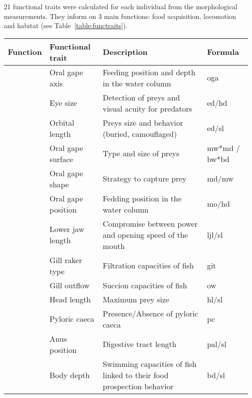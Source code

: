 21 functional traits were calculated for each individual from the morphological measurements. They inform on 3 main functions: food acquisition, locomotion and habitat (see Table~\ref{table:functraits}).

\begin{sidewaystable}
\centering
\caption[Functional traits descriptions and formulas]{Description and formulas of the functionals traits computed from morphological measurements, following \citep{albouy2011, aneeshkumar2017,boyle2006,brindamour2016,diderich2006,dumay2004,habib2019,ibanez2007,sibbing2000,webb1984,winemiller1991}. Abbreviations used in formulas are provided by raw measurements and detailed in appendices \ref{fig:full_body}, \ref{fig:head} \& \ref{fig:fin}. \texttt{oga}, \texttt{git}, \texttt{pc}, \texttt{pht} are categorial variables directly provided by raw measurements with the first two scores detailed respectively in appendices \ref{fig:git} \& \ref{fig:oga}.}
\label{table:functraits}
\begin{tabular}{>{\bfseries}llll}
\toprule
Function & Functional trait & Description & Formula  \\ 
\midrule
\multirow{13}{*}{Feeding} &Oral gape axis & Feeding position and depth in the water column & oga \\ 
  &Eye size & Detection of preys and visual acuity for predators & ed/hd \\ 
  &Orbital length & Preys size and behavior (buried, camouflaged) & ed/sl \\ 
  &Oral gape surface & Type and size of preys & mw*md / bw*bd \\ 
  &Oral gape shape & Strategy to capture prey & md/mw \\ 
  &Oral gape position & Fedding position in the water column & mo/hd \\ 
  &Lower jaw length & Compromise between power and opening speed of the mouth & ljl/sl \\ 
  &Gill raker type & Filtration capacities of fish & git \\ 
  &Gill outflow & Succion capacities of fish & ow \\ 
  &Head length & Maximum prey size & hl/sl \\ 
  &Pyloric caeca & Presence/Absence of pyloric caeca & pc \\ 
  &Anus position & Digestive tract length & pal/sl \\ 
\midrule
  \multirow{6}{*}{Locomotion} & Body depth & Swimming capacities of fish linked to their food prospection behavior & bd/sl \\ 

\end{tabular}
\end{sidewaystable}
